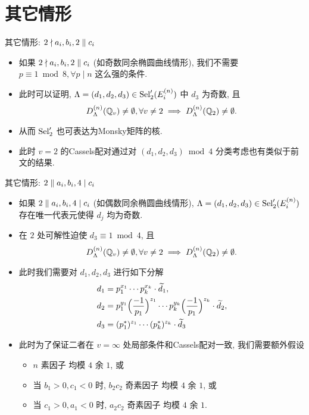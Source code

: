 \documentclass[aspectratio=169,handout]{ctexbeamer}
\begin{document}
\section{其它情形}
\begin{frame}{其它情形: $2\nmid a_i,b_i,2\parallel c_i$}
\begin{itemize}
\item 如果 $2\nmid a_i,b_i,2\parallel c_i$ (如奇数同余椭圆曲线情形), 我们不需要 $p\equiv 1\bmod 8,\forall p\mid n$ 这么强的条件.
\item 此时可以证明, $\Lambda=(d_1,d_2,d_3)\in{\mathrm{Sel}}_2'(E_i^{(n)})$ 中 $d_3$ 为奇数, 且
\[D_{\Lambda}^{(n)}({\mathbb{Q}}_v)\neq\emptyset,\forall v\neq 2
\implies D_{\Lambda}^{(n)}({\mathbb{Q}}_2)\neq\emptyset.\]
\item 从而 ${\mathrm{Sel}}_2'$ 也可表达为Monsky矩阵的核.
\item 此时 $v=2$ 的Cassels配对通过对 $(d_1,d_2,d_3)\bmod 4$ 分类考虑也有类似于前文的结果.
\end{itemize}
\end{frame}


\begin{frame}{其它情形: $2\parallel a_i,b_i, 4\mid c_i$}
\begin{itemize}
\item 如果 $2\parallel a_i,b_i, 4\mid c_i$ (如偶数同余椭圆曲线情形), $\Lambda=(d_1,d_2,d_3)\in{\mathrm{Sel}}_2'(E_i^{(n)})$ 存在唯一代表元使得 $d_j$ 均为奇数.
\item 在 $2$ 处可解性迫使 $d_3\equiv 1\bmod 4$, 且
\[D_{\Lambda}^{(n)}({\mathbb{Q}}_v)\neq\emptyset,\forall v\neq 2
\implies D_{\Lambda}^{(n)}({\mathbb{Q}}_2)\neq\emptyset.\]
\item 此时我们需要对 $d_1,d_2,d_3$ 进行如下分解
\[\begin{split}
	d_1&=p_1^{x_1}\cdots p_k^{x_k}\cdot \widetilde d_1,\\
	d_2&=p_1^{y_1}\Bigl(\frac{{-1}}{p_1}\Bigr)^{z_1}\cdots p_k^{y_k}\Bigl(\frac{{-1}}{p_1}\Bigr)^{z_k}\cdot \widetilde d_2,\\
	d_3&=(p_1^*)^{z_1}\cdots (p_k^*)^{z_k}\cdot \widetilde d_3
\end{split}\]
\item 此时为了保证二者在 $v=\infty$ 处局部条件和Cassels配对一致, 我们需要额外假设
\begin{itemize}
	\item $n$ 素因子 均模 $4$ 余 $1$, 或
	\item 当 $b_1>0, c_1<0$ 时, $b_2c_2$ 奇素因子 均模 $4$ 余 $1$, 或
	\item 当 $c_1>0, a_1<0$ 时, $a_2c_2$ 奇素因子 均模 $4$ 余 $1$.
\end{itemize}
\end{itemize}
\end{frame}
\end{document}
